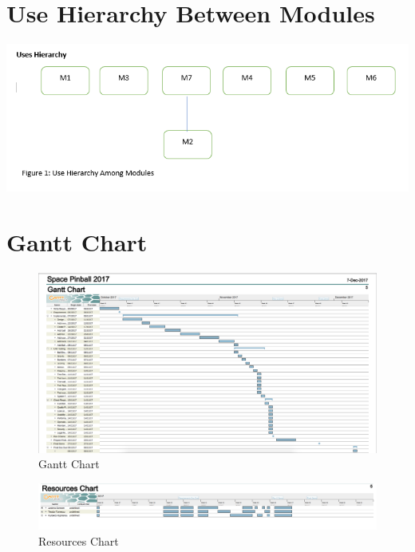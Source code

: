 \documentclass[12pt, titlepage]{article}
\begin{document}
\section{Use Hierarchy Between Modules} \label{SecUse}

\includegraphics[scale=0.9]{4.png}
\newpage

\section{Gantt Chart}


\begin{figure}[h]
  \includegraphics[scale=0.19]{gan.png}
  \caption{Gantt Chart}
  \label{fig:Gantt Chart}
\end{figure}

\begin{figure}[h]
  \includegraphics[scale=0.4]{res.png}
  \caption{Resources Chart}
  \label{fig:Resources Chart}
\end{figure}



\clearpage
\end{document}
